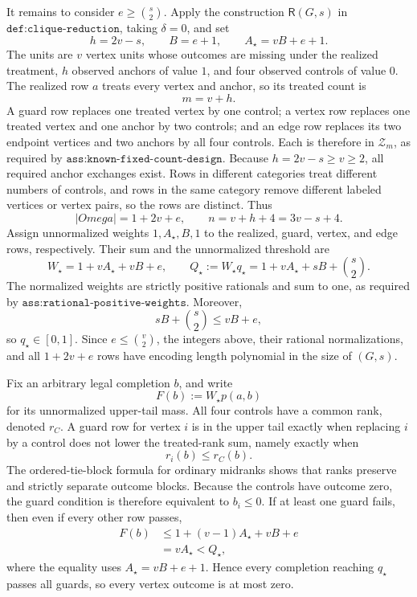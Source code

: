 It remains to consider \(e\ge\binom{s}{2}\).  Apply the construction \(\mathsf R(G,s)\) in \(\texttt{def:clique-reduction}\), taking \(\delta=0\), and set
\[
 h=2v-s,\qquad B=e+1,\qquad
 A_\star=vB+e+1.
\]
The units are \(v\) vertex units whose outcomes are missing under the realized treatment, \(h\) observed anchors of value \(1\), and four observed controls of value \(0\).  The realized row \(a\) treats every vertex and anchor, so its treated count is
\[
 m=v+h.
\]
A guard row replaces one treated vertex by one control; a vertex row replaces one treated vertex and one anchor by two controls; and an edge row replaces its two endpoint vertices and two anchors by all four controls.  Each is therefore in \(\mathcal Z_m\), as required by \(\texttt{ass:known-fixed-count-design}\).  Because \(h=2v-s\ge v\ge2\), all required anchor exchanges exist.  Rows in different categories treat different numbers of controls, and rows in the same category remove different labeled vertices or vertex pairs, so the rows are distinct.  Thus
\[
 |Omega|=1+2v+e,
 \qquad
 n=v+h+4=3v-s+4.
\]
Assign unnormalized weights \(1,A_\star,B,1\) to the realized, guard, vertex, and edge rows, respectively.  Their sum and the unnormalized threshold are
\[
 W_\star=1+vA_\star+vB+e,
 \qquad
 Q_\star:=W_\star q_\star
 =1+vA_\star+sB+\binom{s}{2}.
\]
The normalized weights are strictly positive rationals and sum to one, as required by \(\texttt{ass:rational-positive-weights}\).  Moreover,
\[
 sB+\binom{s}{2}\le vB+e,
\]
so \(q_\star\in[0,1]\).  Since \(e\le\binom v2\), the integers above, their rational normalizations, and all \(1+2v+e\) rows have encoding length polynomial in the size of \((G,s)\).

Fix an arbitrary legal completion \(b\), and write
\[
 F(b):=W_\star p(a,b)
\]
for its unnormalized upper-tail mass.  All four controls have a common rank, denoted \(r_C\).  A guard row for vertex \(i\) is in the upper tail exactly when replacing \(i\) by a control does not lower the treated-rank sum, namely exactly when
\[
 r_i(b)\le r_C(b).
\]
The ordered-tie-block formula for ordinary midranks shows that ranks preserve and strictly separate outcome blocks.  Because the controls have outcome zero, the guard condition is therefore equivalent to \(b_i\le0\).  If at least one guard fails, then even if every other row passes,
\[
\begin{aligned}
 F(b)
 &\le 1+(v-1)A_\star+vB+e\\
 &=vA_\star
 <Q_\star,
\end{aligned}
\]
where the equality uses \(A_\star=vB+e+1\).  Hence every completion reaching \(q_\star\) passes all guards, so every vertex outcome is at most zero.

